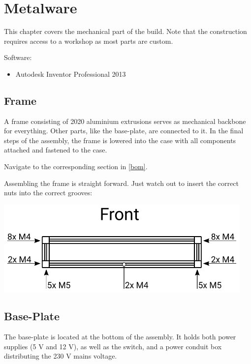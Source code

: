 \chapter{Metalware}

This chapter covers the mechanical part of the build.
Note that the construction requires access to a workshop as most parts are custom.

Software:

\begin{itemize}
	\item Autodesk Inventor Professional 2013
\end{itemize}

\section{Frame}

A frame consisting of 2020 aluminium extrusions serves as mechanical backbone for everything.
Other parts, like the base-plate, are connected to it.
In the final steps of the assembly, the frame is lowered into the case with all components attached and fastened to the case.

Navigate to the corresponding section in \cref{bom}.

Assembling the frame is straight forward.
Just watch out to insert the correct nuts into the correct grooves:

\begin{center}
	\includegraphics[width=0.95\textwidth]{inc/drawing_frame_front_nuts.pdf}
\end{center}



\section{Base-Plate}

The base-plate is located at the bottom of the assembly.
It holds both power supplies (5 V and 12 V), as well as the switch, and a power conduit box distributing the 230 V mains voltage.

